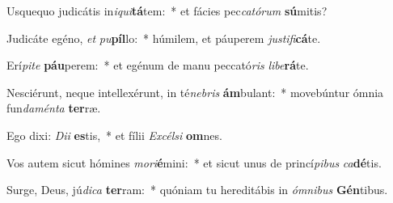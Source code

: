 \item Usquequo judicátis in\textit{i}\textit{qui}\textbf{tá}tem:~* et fácies pec\textit{ca}\textit{tó}\textit{rum} \textbf{sú}mitis?
\item Judicáte egéno, \textit{et} \textit{pu}\textbf{píl}lo:~* húmilem, et páuperem \textit{jus}\textit{ti}\textit{fi}\textbf{cá}te.
\item Erí\textit{pi}\textit{te} \textbf{páu}perem:~* et egénum de manu peccató\textit{ris} \textit{li}\textit{be}\textbf{rá}te.
\item Nesciérunt, neque intellexérunt, in té\textit{ne}\textit{bris} \textbf{ám}bulant:~* movebúntur ómnia fun\textit{da}\textit{mén}\textit{ta} \textbf{ter}ræ.
\item Ego dixi: \textit{Di}\textit{i} \textbf{es}tis,~* et fílii \textit{Ex}\textit{cél}\textit{si} \textbf{om}nes.
\item Vos autem sicut hómines \textit{mo}\textit{ri}\textbf{é}mini:~* et sicut unus de princí\textit{pi}\textit{bus} \textit{ca}\textbf{dé}tis.
\item Surge, Deus, jú\textit{di}\textit{ca} \textbf{ter}ram:~* quóniam tu hereditábis in \textit{óm}\textit{ni}\textit{bus} \textbf{Gén}tibus.
